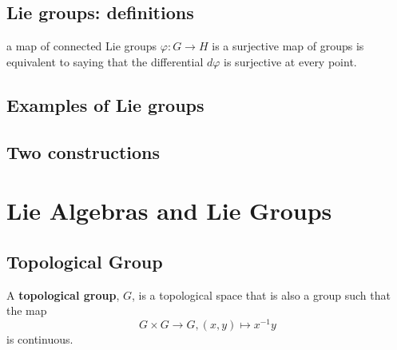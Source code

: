 \documentclass[12pt, letterpaper]{article}
\newcommand{\red}[1]{{\color{red} #1}}
\theoremstyle{definition}
\theoremstyle{remark}
\theoremstyle{definition}
\theoremstyle{plain}
\numberwithin{equation}{section}
\begin{document}
	\subsection{Lie groups: definitions}

	\red{a map of connected Lie 
	groups $\varphi\colon G\to H$ is a surjective map of groups is equivalent to saying that the 
	differential $d\varphi$ is surjective at every point.}
	
	\subsection{Examples of Lie groups}
	
	\subsection{Two constructions}
	
	\section{Lie Algebras and Lie Groups}
	
	\setcounter{subsection}{-1}
	\subsection{Topological Group}
	
	\begin{def*}
		A \textbf{topological group}, $G$, is a topological space that is also a group such that the map
		\[G\times G\to G,(x,y)\mapsto x^{-1}y\]
		is continuous.
	\end{def*}
	
\end{document}
